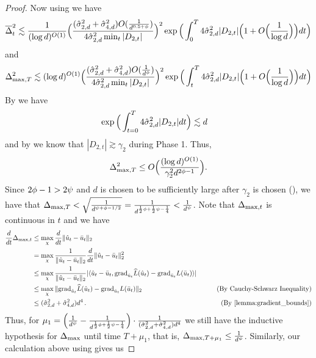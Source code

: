 \begin{proof}
Now using  we have
\begin{align}
\overline{\Delta}_t^2 \lesssim \frac{1}{(\log d)^{O(1)}} \Big(\frac{(\hat{\sigma}_{2, d}^2 + \hat{\sigma}_{4, d}^2) O(\frac{1}{d^{0.5 + \phi}})}{4\hat{\sigma}_{2, d}^2 \min_t|D_{2,t}| }\Big)^2\exp\Big( \int_{0}^T 4\hat{\sigma}_{2, d}^2|D_{2,t}| \Big(1+O\Big(\frac{1}{\log d}\Big)\Big) dt  \Big)
\end{align}
and
\begin{align}
\Delta_{\textup{max}, T}^2 \lesssim (\log d)^{O(1)} \Big(\frac{(\hat{\sigma}_{2, d}^2 + \hat{\sigma}_{4, d}^2) O(\frac{1}{d^{\phi}})}{4\hat{\sigma}_{2, d}^2 \min_t|D_{2,t}| }\Big)^2\exp\Big( \int_{t}^T 4\hat{\sigma}_{2, d}^2|D_{2,t}| \Big(1+O\Big(\frac{1}{\log d}\Big)\Big) dt  \Big)
\end{align}
By  we have
\begin{align}
\exp\Big(\int_{t = 0}^T 4 \hat{\sigma}_{2, d}^2 |D_{2, t}| dt\Big) 
& \lesssim d
\end{align}
and by  we know that $|D_{2, t}| \gtrsim \gamma_2$ during Phase 1. Thus,
\begin{align}\label{eq:induction_1}
	\Delta_{\textup{max}, T}^2 \le O\Big(\frac{(\log d)^{O(1)}}{\gamma_2^2 d^{2\phi-1}}\Big).
\end{align}
Since $2\phi-1>2\psi$ and $d$ is chosen to be sufficiently large after $\gamma_2$ is chosen (), we have that $\Delta_{\textup{max}, T} < \sqrt{\frac{1}{d^{\psi + \phi - 1/2}}} = \frac{1}{d^{\frac{1}{2}\phi + \frac{1}{2}\psi - \frac{1}{4}}}< \frac{1}{d^{\psi}}$. Note that $\Delta_{\textup{max}, t}$ is continuous in $t$ and we have
\begin{align}
\frac{d}{dt} \deltaMaxt{t}
& \leq \max_\chi \frac{d}{dt} \|\uhat_t - \ubar_t\|_2 \\
& = \max_\chi \frac{1}{\|\uhat_t - \ubar_t\|_2} \frac{d}{dt} \|\uhat_t - \ubar_t\|_2^2 \\
& \leq \max_\chi \frac{1}{\|\uhat_t - \ubar_t\|_2} |\langle \uhat_t - \ubar_t, \pgrad_{\uhat_t} \Lhat(\uhat_t) - \pgrad_{\ubar_t} L(\ubar_t) \rangle| \\
& \leq \max_\chi \|\pgrad_{\uhat_t} \Lhat(\uhat_t) - \pgrad_{\ubar_t} L(\ubar_t)\|_2
& \tag{By Cauchy-Schwarz Inequality} \\
& \leq (\sigmaCoeffTwo^2 + \sigmaCoeffFour^2) d^4 \period
& \tag{By \Cref{lemma:gradient_bounds}}
\end{align}
Thus, for $\mu_1= \Big(\frac{1}{d^{\psi}} -\frac{1}{d^{\frac{1}{2}\phi + \frac{1}{2}\psi - \frac{1}{4}}}\Big) \cdot \frac{1}{(\hat{\sigma}_{2, d}^2 + \hat{\sigma}_{4, d}^2) d^4}$ we still have the inductive hypothesis for $\Delta_{\textup{max}}$ until time $T+\mu_1$, that is, $\Delta_{\textup{max}, T+\mu_1} \le \frac{1}{d^{\psi}}$. Similarly, our calculation above using  gives us

\end{proof}
